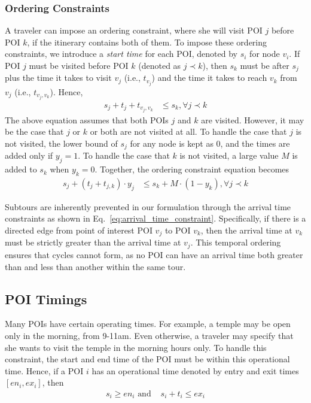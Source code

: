 \subsubsection{\textbf{Ordering Constraints}}
\label{sec:ordering}

A traveler can impose an ordering constraint, where she will visit POI $j$ before POI $k$, if the itinerary contains both of them.
To impose these ordering constraints, we introduce a \emph{start time} for each POI, denoted by $s_i$ for node $v_i$.
If POI $j$ must be visited before POI $k$ (denoted as $j \prec k$), then $s_k$ must be after $s_j$ plus
the time it takes to visit $v_j$ (i.e., $t_{v_j}$) and the time it takes to
reach $v_k$ from $v_j$ (i.e., $t_{v_j,v_k}$).
Hence,
%
\begin{align}
	s_j + t_{j} + t_{v_j,v_k} & \leq s_k, \forall j \prec k
\end{align}
%
The above equation assumes that both POIs $j$ and $k$ are visited.
However, it may be the case that $j$ or $k$ or both are not visited at all.
To handle the case that $j$ is not visited, the lower bound of $s_j$ for any
node is kept as $0$, and the times are added only if $y_j = 1$.
To handle the case that $k$ is not visited, a large value $M$ is added to $s_k$
when $y_k = 0$.
Together, the ordering constraint equation becomes
%
\begin{align}
	\label{eq:ordering}
	s_j + (t_{j} + t_{j,k}) \cdot y_j & \leq s_k + M \cdot (1 - y_k), \forall j \prec k
\end{align}

\noindent Subtours are inherently prevented in our formulation through the arrival time constraints as shown in Eq.~\eqref{eq:arrival_time_constraint}. Specifically, if there is a directed edge from point of interest POI $v_j$  to POI $v_k$, then the arrival time at $v_k$ must be strictly greater than the arrival time at $v_j$. This temporal ordering ensures that cycles cannot form, as no POI can have an arrival time both greater than and less than another within the same tour.

\subsection{POI Timings}
\label{sec:timings}

Many POIs have certain operating times.  For example, a temple may be open
only in the morning, from 9-11am.  Even otherwise, a traveler may specify that she wants to visit the temple in the morning hours only.  To handle this constraint, the start and
end time of the POI must be within this operational time.  Hence, if a POI
$i$ has an operational time denoted by entry and exit times $[en_i, ex_i]$,
then
%
\begin{align}
	\label{eq:operational}
	s_i \geq en_i \text{ and } & s_i + t_{i} \leq ex_i
\end{align}

